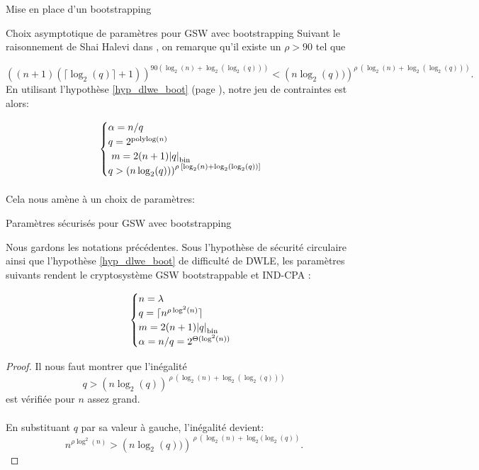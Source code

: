 \begin{section}{Mise en place d'un bootstrapping}
\begin{subsection}{Choix asymptotique de paramètres pour GSW avec bootstrapping}
Suivant le raisonnement de Shai Halevi dans \cite{halevi}, on remarque 
qu'il existe un $\rho > 90$ tel que 

\begin{equation*}
{\left((n+1)(\lceil \log_2(q) \rceil + 1 )\right)}^{90 \left(\log_2(n) +
\log_2(\log_2(q))\right)} < 
{\left(n\log_2(q))\right)}^{\rho\:\left(\log_2(n) + \log_2(\log_2(q))\right)}.
\end{equation*}
En utilisant l'hypothèse  \ref{hyp_dlwe_boot} (page \pageref{hyp_dlwe_boot}), notre jeu de contraintes est alors:

\[ \begin{cases}
\alpha  = n /q \\
	q = 2^\text{polylog$(n)$}\\ 
	m = 2(n+1) \bnorm{q} \\  
	q > {\left(n\log_2(q))\right)}^{\rho\: \left[\log_2(n) + \log_2(\log_2(q))\right]}
	\end{cases} \]

\paragraph{}
Cela nous amène à un choix de paramètres:
\begin{thm}{Paramètres sécurisés pour GSW avec bootstrapping}

Nous gardons les notations précédentes.
Sous l'hypothèse de sécurité circulaire ainsi que l'hypothèse \ref{hyp_dlwe_boot} de difficulté de DWLE, les paramètres
suivants rendent le cryptosystème GSW bootstrappable et IND-CPA :

\[ \begin{cases}
 	n = \lambda \\
	q = \lceil n^{\rho \log^2(n)}\rceil \\
	m = 2(n+1) \bnorm{q} \\  
	\alpha = n/q = 2^{\Theta(\log^2(n))}
	\end{cases} \]
\end{thm}
\begin{proof}
Il nous faut montrer que l'inégalité 
	\[ q > {\left(n\log_2(q)\right)}^{\:\rho\:\left(\log_2(n) + \log_2(\log_2(q))\right)} \]
est vérifiée pour $n$ assez grand.

\paragraph{}
En substituant $q$ par sa valeur à gauche, l'inégalité devient:
\begin{equation*}
n^{\rho \log^2(n)} > {\left(n\log_2(q))\right)}^{\:\rho\: \left(\log_2(n) + \log_2(\log_2(q)\right)}.
\end{equation*}


\end{proof}
\end{subsection}
\end{section}
